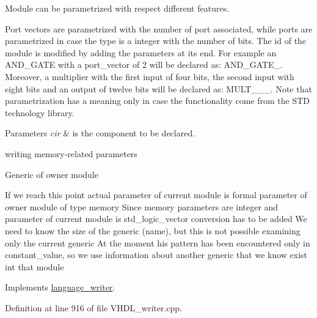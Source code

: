 Module can be parametrized with respect different features. 

Port vectors are parametrized with the number of port associated, while ports are parametrized in case the type is a integer with the number of bits. The id of the module is modified by adding the parameters at its end. For example an A\+N\+D\+\_\+\+G\+A\+TE with a port\+\_\+vector of 2 will be declared as\+: A\+N\+D\+\_\+\+G\+A\+T\+E\+\_. Moreover, a multiplier with the first input of four bits, the second input with eight bits and an output of twelve bits will be declared as\+: M\+U\+L\+T\+\_\+\_\+\_. Note that parametrization has a meaning only in case the functionality come from the S\+TD technology library. 
\begin{DoxyParams}{Parameters}
{\em cir} & is the component to be declared. \\
\hline
\end{DoxyParams}
writing memory-\/related parameters

Generic of owner module

If we reach this point actual parameter of current module is formal parameter of owner module of type memory Since memory parameters are integer and parameter of current module is std\+\_\+logic\+\_\+vector conversion has to be added We need to know the size of the generic (name), but this is not possible examining only the current generic At the moment his pattern has been encountered only in constant\+\_\+value, so we use information about another generic that we know exist int that module 

Implements \hyperlink{classlanguage__writer_a393febaf037080d4a91588cfa699c8cb}{language\+\_\+writer}.



Definition at line 916 of file V\+H\+D\+L\+\_\+writer.\+cpp.



